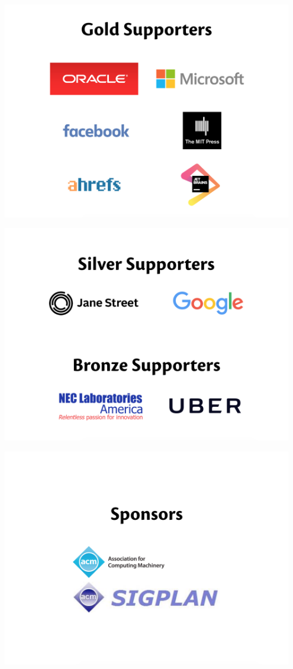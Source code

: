 

\begin{center}
\includegraphics[width=0.95\textwidth]{img/supporter-gold.png}
\end{center}

\begin{center}
\includegraphics[width=0.95\textwidth]{img/supporter-silver-bronze.png}
\end{center}


\begin{center}
\includegraphics[width=0.95\textwidth]{img/sponsor.png}
\end{center}

\newpage
